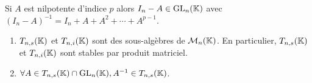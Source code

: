 \documentclass[12pt, a4paper]{report}
\begin{document}
\begin{remark}
    Si $A$ est nilpotente d'indice $p$ alors $I_n - A \in \mathrm{GL}_n(\mathbb{K})$ avec $(I_n - A)^{-1} = I_n + A + A^2 + \cdots + A^{p-1}$.
\end{remark}

\begin{property}
    \begin{enumerate}
        \item $T_{n,s}(\mathbb{K})$ et $T_{n,i}(\mathbb{K})$ sont des sous-algèbres de $\mathcal M_n(\mathbb{K})$. En particulier, $T_{n,s}(\mathbb{K})$ et $T_{n,i}(\mathbb{K})$ sont stables par produit matriciel.
        \item $\forall A \in T_{n,s}(\mathbb{K})\cap \mathrm{GL}_n(\mathbb{K}), A^{-1} \in T_{n,s}(\mathbb{K})$.
    \end{enumerate}
\end{property}
\end{document}
